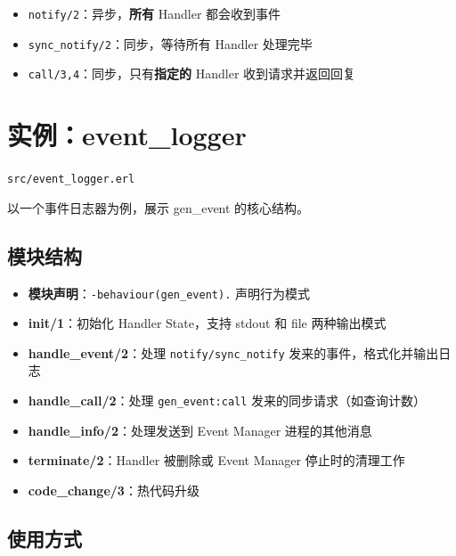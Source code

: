 \documentclass[a4paper,11pt]{article}
\begin{document}
\begin{notebox}
\begin{itemize}[leftmargin=1.5em]
    \item \texttt{notify/2}：异步，\textbf{所有} Handler 都会收到事件
    \item \texttt{sync\_notify/2}：同步，等待所有 Handler 处理完毕
    \item \texttt{call/3,4}：同步，只有\textbf{指定的} Handler 收到请求并返回回复
\end{itemize}
\end{notebox}


\section{实例：event\_logger}

\begin{notebox}[源码文件]
\texttt{src/event\_logger.erl}
\end{notebox}

以一个事件日志器为例，展示 gen\_event 的核心结构。

\subsection{模块结构}

\begin{itemize}[leftmargin=2em]
    \item \textbf{模块声明}：\texttt{-behaviour(gen\_event).} 声明行为模式
    \item \textbf{init/1}：初始化 Handler State，支持 stdout 和 file 两种输出模式
    \item \textbf{handle\_event/2}：处理 \texttt{notify/sync\_notify} 发来的事件，格式化并输出日志
    \item \textbf{handle\_call/2}：处理 \texttt{gen\_event:call} 发来的同步请求（如查询计数）
    \item \textbf{handle\_info/2}：处理发送到 Event Manager 进程的其他消息
    \item \textbf{terminate/2}：Handler 被删除或 Event Manager 停止时的清理工作
    \item \textbf{code\_change/3}：热代码升级
\end{itemize}

\subsection{使用方式}
\end{document}
